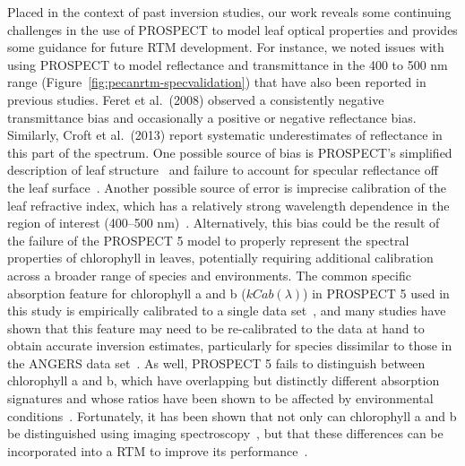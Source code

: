 Placed in the context of past inversion studies, our work reveals some continuing challenges in the use of PROSPECT to model leaf optical properties and provides some guidance for future RTM development.
For instance, we noted issues with using PROSPECT to model reflectance and transmittance in the 400 to 500 nm range (Figure~\ref{fig:pecanrtm-specvalidation}) that have also been reported in previous studies. %
Feret et al.~(2008) observed a consistently negative transmittance bias and occasionally a positive or negative reflectance bias. \nocite{feret_2008_prospect}
Similarly, Croft et al.~(2013) report systematic underestimates of reflectance in this part of the spectrum. \nocite{croft_2013_modelling}
One possible source of bias is PROSPECT's simplified description of leaf structure~\cite{jacquemoud_1990_prospect} and failure to account for specular reflectance off the leaf surface~\cite{grant_1987_diffuse}.
Another possible source of error is imprecise calibration of the leaf refractive index, which has a relatively strong wavelength dependence in the region of interest (400--500 nm)~\cite{feret_2008_prospect}.
Alternatively, this bias could be the result of the failure of the PROSPECT 5 model to properly represent the spectral properties of chlorophyll in leaves, potentially requiring additional calibration across a broader range of species and environments.
The common specific absorption feature for chlorophyll a and b ($kCab(\lambda)$) in PROSPECT 5 used in this study is empirically calibrated to a single data set~\cite[ANGERS; ][]{feret_2008_prospect},
and many studies have shown that this feature may need to be re-calibrated to the data at hand to obtain accurate inversion estimates,
particularly for species dissimilar to those in the ANGERS data set~\cite{malenovsky_2006_applicability,moorthy_2008_estimating,zhang_2008_retrieving,li_2013_retrieval}.
As well, PROSPECT 5 fails to distinguish between chlorophyll a and b, which have overlapping but distinctly different absorption signatures and whose ratios have been shown to be affected by environmental conditions~\cite{blackburn_2006_hyperspectral,divittorio_2009_spectral,divittorio_2009_enhancing}.
Fortunately, it has been shown that not only can chlorophyll a and b be distinguished using imaging spectroscopy~\cite{divittorio_2009_pigment}, but that these differences can be incorporated into a RTM to improve its performance~\cite{divittorio_2009_enhancing}.


